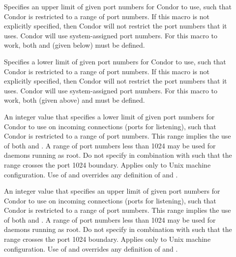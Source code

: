 \begin{description}
\item[] \label{param:HighPort}
  Specifies an upper limit of given port numbers for Condor to use,
  such that Condor is restricted to a range of port numbers.
  If this macro is not explicitly specified, then Condor will
  not restrict the port numbers that it uses. Condor will use
  system-assigned port numbers.
  For this macro to work, both  and
   (given below) must be defined.

\item[] \label{param:LowPort}
  Specifies a lower limit of given port numbers for Condor to use,
  such that Condor is restricted to a range of port numbers.
  If this macro is not explicitly specified, then Condor will
  not restrict the port numbers that it uses. Condor will use
  system-assigned port numbers.
  For this macro to work, both  (given above) and
   must be defined.

\item[] \label{param:InLowPort}
  An integer value that specifies a lower limit of given port numbers
  for Condor to use on incoming connections (ports for listening),
  such that Condor is restricted to a range of port numbers.
  This range implies the use of both  and
  .
  A range of port numbers less than 1024 may be used for daemons 
  running as root.
  Do not specify  in combination with 
   such that the range crosses the port 1024
  boundary.
  Applies only to Unix machine configuration.
  Use of  and  overrides
  any definition of  and .

\item[] \label{param:InHighPort}
  An integer value that specifies an upper limit of given port numbers
  for Condor to use on incoming connections (ports for listening),
  such that Condor is restricted to a range of port numbers.
  This range implies the use of both  and
  .
  A range of port numbers less than 1024 may be used for daemons 
  running as root.
  Do not specify  in combination with 
   such that the range crosses the port 1024
  boundary.
  Applies only to Unix machine configuration.
  Use of  and  overrides
  any definition of  and .


\end{description}
